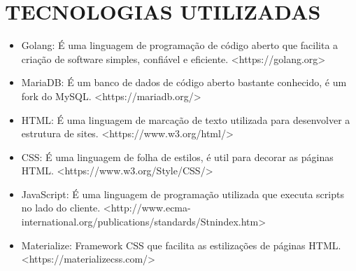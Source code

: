 %
%

\section{TECNOLOGIAS UTILIZADAS}

\begin{itemize}
	\item Golang: É uma linguagem de programação de código aberto que facilita a criação de software simples, confiável e eficiente. <https://golang.org>	
	\item MariaDB: É um banco de dados de código aberto bastante conhecido, é um fork do MySQL. <https://mariadb.org/>
	\item HTML: É uma linguagem de marcação de texto utilizada para desenvolver a estrutura de sites. <https://www.w3.org/html/>
	\item CSS: É uma linguagem de folha de estilos, é util para decorar as páginas HTML. 
<https://www.w3.org/Style/CSS/>
	\item JavaScript: É uma linguagem de programação utilizada que executa scripts no lado do cliente. 
<http://www.ecma-international.org/publications/standards/Stnindex.htm>
	\item Materialize: Framework CSS que facilita as estilizações de páginas HTML. <https://materializecss.com/>
\end{itemize}
